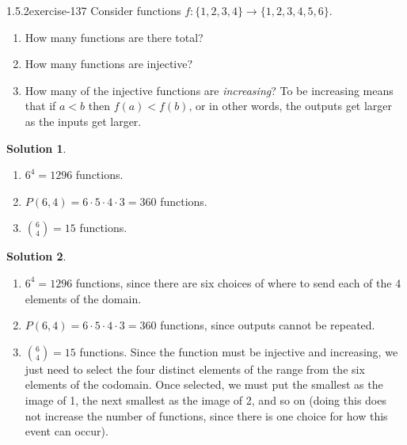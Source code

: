 \documentclass[twoside,11pt,]{book}
\numberwithin{equation}{chapter}
\newcommand{\lt}{<}
\begin{document}
\begin{divisionsolution}{1.5.2}{}{exercise-137}%
\hypertarget{p-2253}{}%
Consider functions \(f: \{1,2,3,4\} \to \{1,2,3,4,5,6\}\text{.}\)\leavevmode%
\begin{enumerate}[label=(\alph*)]
\item\hypertarget{li-1388}{}\hypertarget{p-2254}{}%
How many functions are there total?%
\item\hypertarget{li-1389}{}\hypertarget{p-2256}{}%
How many functions are injective?%
\item\hypertarget{li-1390}{}\hypertarget{p-2258}{}%
How many of the injective functions are \emph{increasing}? To be increasing means that if \(a \lt b\) then \(f(a) \lt f(b)\text{,}\) or in other words, the outputs get larger as the inputs get larger.%
\end{enumerate}
%
\par\smallskip%
\noindent\textbf{Solution 1}.\quad%
\hypertarget{p-2260}{}%
\leavevmode%
\begin{enumerate}[label=(\alph*)]
\item\hypertarget{li-1391}{}\hypertarget{p-2261}{}%
\(6^4 = 1296\) functions.%
\item\hypertarget{li-1392}{}\hypertarget{p-2262}{}%
\(P(6, 4) = 6 \cdot 5 \cdot 4 \cdot 3 = 360\) functions.%
\item\hypertarget{li-1393}{}\hypertarget{p-2263}{}%
\({6 \choose 4} = 15\) functions.%
\end{enumerate}
%
\par\smallskip%
\noindent\textbf{Solution 2}.\quad%
\hypertarget{p-2264}{}%
\leavevmode%
\begin{enumerate}[label=(\alph*)]
\item\hypertarget{li-1394}{}\hypertarget{p-2265}{}%
\(6^4 = 1296\) functions, since there are six choices of where to send each of the 4 elements of the domain.%
\item\hypertarget{li-1395}{}\hypertarget{p-2266}{}%
\(P(6, 4) = 6 \cdot 5 \cdot 4 \cdot 3 = 360\) functions, since outputs cannot be repeated.%
\item\hypertarget{li-1396}{}\hypertarget{p-2267}{}%
\({6 \choose 4} = 15\) functions. Since the function must be injective and increasing, we just need to select the four distinct elements of the range from the six elements of the codomain. Once selected, we must put the smallest as the image of 1, the next smallest as the image of 2, and so on (doing this does not increase the number of functions, since there is one choice for how this event can occur).%
\end{enumerate}
%
\end{divisionsolution}%
\end{document}
